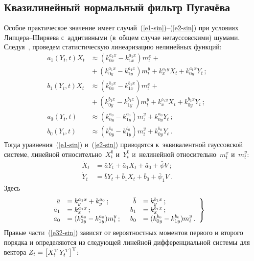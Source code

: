 \begin{multicols}{2}
\section{Квазилинейный нормальный фильтр Пугачёва}


Особое практическое значение имеет случай~(\ref{e1-sin})--(\ref{e2-sin}) при условиях Лип\-це\-ра--Ши\-ря\-ева с~аддитивными (в~общем случае негауссовскими) шумами. Следуя~\cite{1-sin}, проведем статистическую линеаризацию нелинейных функций:
    \begin{align*}
    a_1 \left(Y_t, t\right) X_t &\approx \left(k_{0x}^{a_1 x} - k_{1x}^{a_1 x}\right) m_t^x +{}\\
     &{}+\left( k_{0y}^{a_1 x} - k_{1y}^{a_1 x}\right) m_t^y + k_x^{a_1 y} X_t + k_{0y}^{a_1 x} Y_t\,;
   \\
    b_1 \left(Y_t, t\right) X_t &\approx \left(k_{0x}^{b_1 x} - k_{1x}^{b_1 x}\right) m_t^x + {}\\
    &{}+\left( k_{0y}^{b_1 x} - k_{1y}^{b_1 x}\right) m_t^y + k_x^{b_1 y} X_t + k_{0y}^{b_1 x} Y_t\,;
   \\
    a_0 (Y_t , t) &\approx \left( k_{0y}^{a_0} - k_{1y}^{a_0}\right) m_t^y + k_{0y}^{a_0} Y_t\,;\\
    b_0 \left(Y_t , t\right) &\approx  \left( k_{0y}^{b_0} - k_{1y}^{b_0}\right) m_t^y + k_{0y}^{b_0} Y_t\,.
    \end{align*}
Тогда уравнения~(\ref{e1-sin}) и~(\ref{e2-sin}) приводятся к~эквивалентной гауссовской системе, линейной относительно~$X_t^0$ и~$Y_t^0$ и~нелинейной относительно~$m_t^x$ и~$m_t^y$:
\begin{align}
\dot X_t &= \bar a Y_t + \bar a_1 X_t + \bar a_0 +\bar\psi V\,;\label{e30-sin}\\
\dot Y_t &= \bar b Y_t + \bar b_1 X_t + \bar b_0 +\bar\psi_1 V\,.\label{e31-sin}
\end{align}
Здесь
    \begin{equation}
    \left.
    \begin{array}{rlrl}
    \bar a &= k_y^{a_1x} + k_y^{a_0}\,; &\enskip     \bar b &= k_y^{b_1x} \,;\\
    \bar a_1 &= k_x^{a_1 x}\,;&\enskip \bar b_1 &= k_x^{b_1 x}\,;\\
    a_0 &= (k_{0y}^{a_0} - k_{1y}^{a_0}) m_t^y\,;
 &\enskip b_0 &= (k_{0y}^{b_0} - k_{1y}^{b_0}) m_t^y\,.
    \end{array}
    \right\}
    \label{e32-sin}
    \end{equation}
Правые части~(\ref{e32-sin}) зависят от вероятностных моментов первого и второго порядка и определяются из следующей линейной дифференциальной системы для вектора  $Z_t \hm=\left[ X_t^{\mathrm{T}}\, Y_t^{\mathrm{T}}\right]^{\mathrm{T}}$:

\end{multicols}
